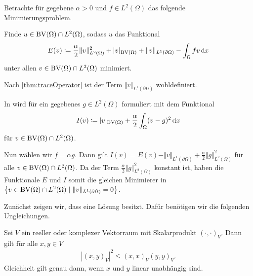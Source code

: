 Betrachte für gegebene $\alpha>0$ und $f\in L^2(\Omega)$ das 
folgende Minimierungsproblem. 

\begin{problem}\label{prob:continuousProblem}
  Finde $u\in \textup{BV}(\Omega)\cap L^2(\Omega)$, sodass
  $u$ das Funktional
  \begin{align}\label{eq:continuousProblem}
    E(v)\coloneqq \frac{\alpha}{2}\Vert v\Vert_{L^2(\Omega)}^2 + |v|_{\textup{BV}(\Omega)}
    +\Vert v\Vert_{L^1(\partial\Omega)}-\int_\Omega fv\,\mathrm{d}x
  \end{align}
  unter allen $v\in\textup{BV}(\Omega)\cap L^2(\Omega)$ minimiert.

  Nach \cref{thm:traceOperator} ist der Term $\Vert
  v\Vert_{L^1(\partial\Omega)}$ wohldefiniert.
\end{problem}

\begin{remark}
  In \cite[Kapitel~10.1.3]{Bar15} wird  für ein
  gegebenes $g\in L^2(\Omega)$ formuliert
  mit dem Funktional 
  \begin{align*}
    I(v)\coloneqq |v|_{\textup{BV}(\Omega)} + \frac{\alpha}{2}\int_\Omega (v-g)^2\,\mathrm{d}x
  \end{align*}
  für $v\in \textup{BV}(\Omega)\cap L^2(\Omega)$.

  Nun wählen wir $f = \alpha g$. Dann gilt
  $I(v) = E(v) - \Vert v\Vert_{L^1(\partial \Omega)}+ 
  \frac{\alpha}{2}\Vert g\Vert_{L^2(\Omega)}^2$ für alle 
  $v\in \textup{BV}(\Omega)\cap L^2(\Omega)$. Da der Term $\frac{\alpha}{2}\Vert
  g\Vert_{L^2(\Omega)}^2$ konstant ist, haben die Funktionale $E$ und $I$ somit
  die gleichen Minimierer in $\left\{v\in\textup{BV}(\Omega)\cap L^2(\Omega)\mid 
  \Vert v\Vert_{L^1(\partial\Omega)}=0\right\}$.
\end{remark}

Zunächst zeigen wir, dass  eine Lösung besitzt.
Dafür benötigen wir die folgenden Ungleichungen.

\begin{lemma}
  \label{lem:csu}
  Sei $V$ ein reeller oder komplexer Vektorraum mit Skalarprodukt
  $(\cdot,\cdot)_V$. Dann gilt für alle $x,y\in V$
  \begin{align*}
    |(x,y)_V|^2\leq (x,x)_V (y,y)_V.
  \end{align*}
  Gleichheit gilt genau dann, wenn $x$ und $y$ linear unabhängig sind.
\end{lemma}

